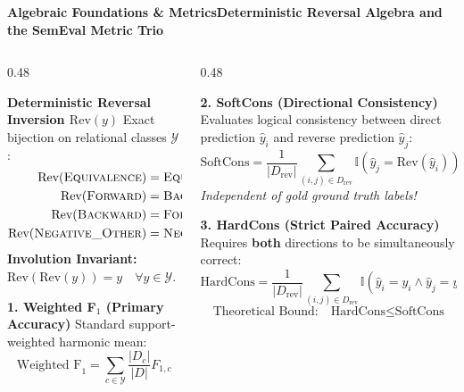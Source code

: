 \documentclass[aspectratio=169,10pt]{beamer}
\begin{document}
\begin{frame}{\textbf{Algebraic Foundations \& Metrics}}{\textbf{Deterministic Reversal Algebra and the SemEval Metric Trio}}
  \begin{columns}[T]
    \begin{column}{0.48\textwidth}
      \begin{block}{\textbf{Deterministic Reversal Inversion $\text{Rev}(y)$}}
        \small
        Exact bijection on relational classes $\mathcal{Y}$:
        \begin{align*}
          \text{Rev}(\textsc{Equivalence}) &= \textsc{Equivalence} \\
          \text{Rev}(\textsc{Forward}) &= \textsc{Backward} \\
          \text{Rev}(\textsc{Backward}) &= \textsc{Forward} \\
          \text{Rev}(\textsc{Negative\_Other}) &= \textsc{Negative\_Other}
        \end{align*}
        \textbf{Involution Invariant:} $\text{Rev}(\text{Rev}(y)) = y \quad \forall y \in \mathcal{Y}$.
      \end{block}
      \vspace{0.1cm}
      \begin{block}{\textbf{1. Weighted F$_1$ (Primary Accuracy)}}
        \small
        Standard support-weighted harmonic mean:
        $$\text{Weighted F}_1 = \sum_{c \in \mathcal{Y}} \frac{|D_c|}{|D|} F_{1, c}$$
      \end{block}
    \end{column}

    \begin{column}{0.48\textwidth}
      \begin{block}{\textbf{2. SoftCons (Directional Consistency)}}
        \small
        Evaluates logical consistency between direct prediction $\hat{y}_i$ and reverse prediction $\hat{y}_j$:
        $$\text{SoftCons} = \frac{1}{|D_{\text{rev}}|} \sum_{(i, j) \in D_{\text{rev}}} \mathbb{I}\left(\hat{y}_j = \text{Rev}(\hat{y}_i)\right)$$
        \textit{Independent of gold ground truth labels!}
      \end{block}
      \vspace{0.1cm}
      \begin{block}{\textbf{3. HardCons (Strict Paired Accuracy)}}
        \small
        Requires \textbf{both} directions to be simultaneously correct:
        $$\text{HardCons} = \frac{1}{|D_{\text{rev}}|} \sum_{(i, j) \in D_{\text{rev}}} \mathbb{I}\left(\hat{y}_i = y_i \land \hat{y}_j = y_j\right)$$
        $$\text{Theoretical Bound:} \quad \text{HardCons} \le \text{SoftCons}$$
      \end{block}
    \end{column}
  \end{columns}
\end{frame}
\end{document}
